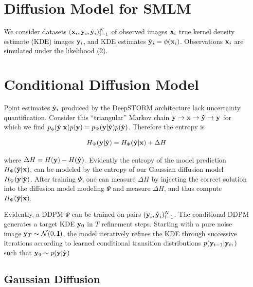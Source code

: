 \documentclass{article}
\begin{document}
\section{Diffusion Model for SMLM}

We consider datasets $(\bold{x}_i,\bold{y}_i,\hat{\bold{y}}_{i})_{i=1}^{N}$ of observed images $\bold{x}_i$ true kernel density estimate (KDE) images $\bold{y}_{i}$, and KDE estimates $\hat{\bold{y}}_{i}=\phi(\bold{x}_{i})$. Observations $\bold{x}_i$ are simulated under the likelihood (2). 

\section{Conditional Diffusion Model}

Point estimates $\hat{\bold{y}}_{i}$ produced by the DeepSTORM architecture lack uncertainty quantification. Consider this ``triangular'' Markov chain $\bold{y} \rightarrow \bold{x} \rightarrow \bold{\hat{y}} \rightarrow \bold{y}$ for which we find $p_{\phi}(\hat{\bold{y}}|\bold{x})p(\bold{y})=p_{\Psi}(\bold{y}|\hat{\bold{y}})p(\hat{\bold{y}})$. Therefore the entropy is

\begin{equation*}
H_{\Psi}(\bold{y}|\hat{\bold{y}}) = H_{\Phi}(\hat{\bold{y}}|\bold{x}) + \Delta H
\end{equation*}

where $\Delta H=H(\bold{y}) - H(\hat{\bold{y}})$. Evidently the entropy of the model prediction $H_{\Phi}(\hat{\bold{y}}|\bold{x})$, can be modeled by the entropy of our Gaussian diffusion model $H_{\Psi}(\bold{y}|\hat{\bold{y}})$. After training $\Psi$, one can measure $\Delta H$ by injecting the correct solution into the diffusion model modeling $\Psi$ and measure $\Delta H$, and thus compute $H_{\Phi}(\hat{\bold{y}}|\bold{x})$.


Evidently, a DDPM $\Psi$ can be trained on pairs $(\bold{y}_i,\hat{\bold{y}}_{i})_{i=1}^{N}$. The conditional DDPM generates a target KDE $\bold{y}_0$ in $T$ refinement steps. Starting with a pure noise image $\bold{y}_{T}\sim \mathcal{N}(0,\bold{I})$, the model iteratively refines the KDE through successive iterations according to learned conditional transition distributions $p(\bold{y}_{t-1}|\bold{y}_{t},\bold{})$ such that $\bold{y}_{0} \sim p(\bold{y}|\hat{\bold{y}})$ 

\subsection{Gaussian Diffusion}
\end{document}
